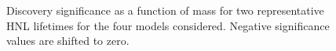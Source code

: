\begin{figure}[!htbp]
    \centering
    \caption{Discovery significance as a function of mass for two representative HNL lifetimes for the four models considered. Negative significance values are shifted to zero.}
    \label{fig:disco_signi}
\end{figure}


